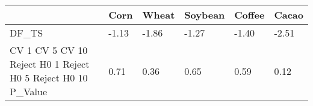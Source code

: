 \begin{tabular}{llllll}
\toprule
 & Corn & Wheat & Soybean & Coffee & Cacao \\
\midrule
DF_TS & -1.13 & -1.86 & -1.27 & -1.40 & -2.51 \\
CV 1%
CV 5%
CV 10%
Reject H0 1%
Reject H0 5%
Reject H0 10%
P_Value & 0.71 & 0.36 & 0.65 & 0.59 & 0.12 \\
\bottomrule
\end{tabular}
